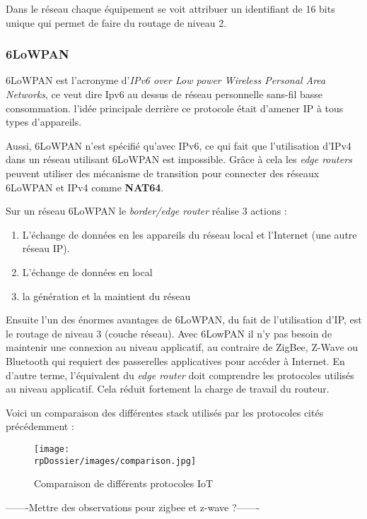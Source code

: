 Dans le réseau chaque équipement se voit attribuer un identifiant de 16 bits unique qui permet de faire du routage de niveau 2.

\subsubsection{6LoWPAN}

6LoWPAN est l'acronyme d'\textit{IPv6 over Low power Wireless Personal Area Networks}, ce veut dire Ipv6 au dessus de réseau personnelle sans-fil basse consommation. l'idée principale derrière ce protocole était d'amener IP à tous types d'appareils. 

Aussi, 6LoWPAN n'est spécifié qu'avec IPv6, ce qui fait que l'utilisation d'IPv4 dans un réseau utilisant 6LoWPAN est impossible. Grâce à cela les \textit{edge routers} peuvent utiliser des mécanisme de transition pour connecter des réseaux 6LoWPAN et IPv4 comme \textbf{NAT64}.

Sur un réseau 6LoWPAN le \textit{border/edge router} réalise 3 actions :

\begin{enumerate}
\item L'échange de données en les appareils du réseau local et l'Internet (une autre réseau IP).
\item L'échange de données en local
\item la génération et la maintient du réseau
\end{enumerate}

Ensuite l'un des énormes avantages de 6LoWPAN, du fait de l'utilisation d'IP, est le routage de niveau 3 (couche réseau). Avec 6LowPAN il n'y pas besoin de maintenir une connexion au niveau applicatif, au contraire de ZigBee, Z-Wave ou Bluetooth qui requiert des passerelles applicatives pour accéder à Internet. En d'autre terme, l'équivalent du \textit{edge router} doit comprendre les protocoles utilisés au niveau applicatif. Cela réduit fortement la charge de travail du routeur.

Voici un comparaison des différentes stack utilisés par les protocoles cités précédemment : 

\begin{figure}[H]
\centering
\texttt{[image: \\rpDossier/images/comparison.jpg]}
\caption{Comparaison de différents protocoles IoT}
\label{comparison}
\end{figure}

-------Mettre des observations pour zigbee et z-wave ?-------

